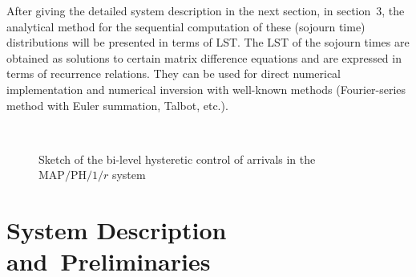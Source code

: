 \begin{multicols}{2}
After giving the detailed system description in 
the next section, in section~3, 
the analytical method for the sequential computation
of these (sojourn time) distributions will be presented
in terms of LST.
The LST of the sojourn times are obtained as solutions to certain matrix difference equations
and are expressed in terms of recurrence relations.
They can be used for direct numerical implementation and 
numerical inversion with well-known methods (Fourier-series method with Euler 
summation, Talbot, etc.).

\begin{figure*}[b] %
\vspace*{1pt}
 \begin{center}
 \mbox{%
 \epsfxsize=123.993mm 
 }

\vspace*{6pt}

{\small Sketch of the bi-level hysteretic control of arrivals in the $\mathrm{MAP}/\mathrm{PH}/1/r$ 
system}

 \end{center}
\end{figure*}



\section{System Description and~Preliminaries}


\end{multicols}
